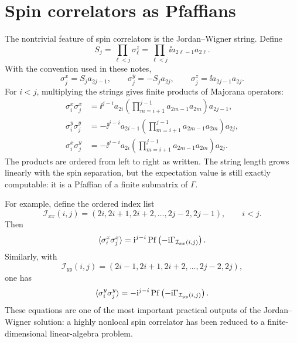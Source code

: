 \section{Spin correlators as Pfaffians}
\label{sec:spin-correlators-as-pfaffians}

The nontrivial feature of spin correlators is the Jordan--Wigner string.  Define
\begin{equation}
\label{eq:jw-string-this-chapter}
    S_j=\prod_{\ell<j}\sigma_\ell^z
    =
    \prod_{\ell<j}\ii a_{2\ell-1}a_{2\ell}.
\end{equation}
With the convention used in these notes,
\begin{equation}
\label{eq:spin-majorana-local-formulas}
    \sigma_j^x=S_ja_{2j-1},
    \qquad
    \sigma_j^y=-S_ja_{2j},
    \qquad
    \sigma_j^z=\ii a_{2j-1}a_{2j}.
\end{equation}
For $i<j$, multiplying the strings gives finite products of Majorana operators:
\begin{align}
\label{eq:sigmax-sigmax-majorana-string}
    \sigma_i^x\sigma_j^x
    &=
    \ii^{j-i}
    a_{2i}
    \left(\prod_{m=i+1}^{j-1}a_{2m-1}a_{2m}\right)
    a_{2j-1},\\
\label{eq:sigmay-sigmay-majorana-string}
    \sigma_i^y\sigma_j^y
    &=
    -\ii^{j-i}
    a_{2i-1}
    \left(\prod_{m=i+1}^{j-1}a_{2m-1}a_{2m}\right)
    a_{2j},\\
\label{eq:sigmax-sigmay-majorana-string}
    \sigma_i^x\sigma_j^y
    &=
    -\ii^{j-i}
    a_{2i}
    \left(\prod_{m=i+1}^{j-1}a_{2m-1}a_{2m}\right)
    a_{2j}.
\end{align}
The products are ordered from left to right as written.  The string length grows
linearly with the spin separation, but the expectation value is still exactly
computable: it is a Pfaffian of a finite submatrix of $\Gamma$.

For example, define the ordered index list
\begin{equation}
\label{eq:index-list-xx-correlator}
    \mathcal{I}_{xx}(i,j)
    =
    (2i,2i+1,2i+2,\ldots,2j-2,2j-1),
    \qquad i<j.
\end{equation}
Then
\begin{equation}
\label{eq:xx-correlator-pfaffian}
    \langle \sigma_i^x\sigma_j^x\rangle
    =
    \mathrm{i}^{j-i}
    \operatorname{Pf}\left(-\mathrm{i}\Gamma_{\mathcal{I}_{xx}(i,j)}\right).
\end{equation}
Similarly, with
\begin{equation}
\label{eq:index-list-yy-correlator}
    \mathcal{I}_{yy}(i,j)
    =
    (2i-1,2i+1,2i+2,\ldots,2j-2,2j),
\end{equation}
one has
\begin{equation}
\label{eq:yy-correlator-pfaffian}
    \langle \sigma_i^y\sigma_j^y\rangle
    =
    -\mathrm{i}^{j-i}
    \operatorname{Pf}\left(-\mathrm{i}\Gamma_{\mathcal{I}_{yy}(i,j)}\right).
\end{equation}
These equations are one of the most important practical outputs of the
Jordan--Wigner solution: a highly nonlocal spin correlator has been reduced to a
finite-dimensional linear-algebra problem.

